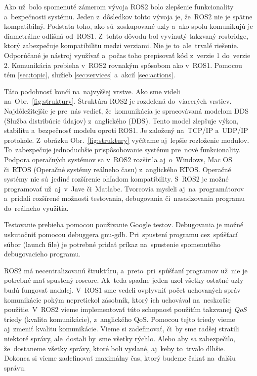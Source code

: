 Ako už~bolo spomenuté zámerom vývoja ROS2 bolo zlepšenie funkcionality a~bezpečnosti systému. Jeden z~dôsledkov tohto vývoja je, že~ROS2
nie je spätne kompatibilný. Podstata toho, ako sú~zoskupované uzly a~ako spolu komunikujú je diametrálne odlišná od~ROS1. Z~tohto dôvodu
bol vyvinutý takzvaný rosbridge, ktorý zabezpečuje kompatibilitu medzi verziami. Nie je to~ale~trvalé riešenie. Odporúčané je nástroj
využívať a~počas toho prepisovať kód z~verzie 1 do~verzie 2. Komunikácia prebieha v~ROS2 rovnakým spôsobom ako v~ROS1. Pomocou tém
\ref{sec:topic}, služieb \ref{sec:services} a~akcií \ref{sec:actions}.

Táto podobnosť končí na~najvyššej vrstve. Ako sme videli na~Obr.~\ref{fig:struktury}. Štruktúra ROS2 je rozdelená do~viacerých vrstiev.
Najdôležitejšie je pre~nás vedieť, že~komunikácia je spracovávaná modelom DDS (Služba distribúcie údajov) z~anglického (\acrlong{DDS}). Tento
model zlepšuje výkon, stabilitu a~bezpečnosť modelu oproti ROS1. Je založený na~TCP/IP a~UDP/IP protokole. Z~obrázku Obr.~\ref{fig:struktury}
vyčítame aj~lepšie rozloženie modulov. To~zabezpečuje jednoduchšie prispôsobovanie systému pre~nové funkcionality. Podpora operačných systémov
sa v~ROS2 rozšírila aj~o~Windows, Mac OS či~RTOS (Operačné systémy reálneho času) z~anglického \acrlong{RTOS}. Operačné systémy nie sú~jediné
rozšírenie ohľadom kompatibility. S~ROS2 je možné programovať už~aj~v~Jave či~Matlabe. Tvorcovia mysleli aj~na~programátorov a~pridali rozšírené
možnosti testovania, debugovania či~nasadzovania programu do~reálneho využitia.

Testovanie prebieha pomocou použivanie Google testov. Debugovania je možné uskutočniť pomocou debuggera gnu-gdb. Pri~spustení programu
cez~spúšťací súbor (launch file) je potrebné pridať príkaz na~spustenie spomenutého debugovacieho programu.

ROS2 má necentralizovanú štruktúru, a~preto~pri~spúšťaní programov už~nie je potrebné mať spustený roscore. Ak~teda spadne jeden uzol všetky
ostatné uzly budú fungovať naďalej. V~ROS1 sme vedeli ovplyvniť počet uchovaných správ komunikácie pokým nepretiekol zásobník, ktorý ich uchovával
na~neskoršie použitie. V~ROS2 vieme implementovať túto schopnosť použitím takzvanej \textit{QoS} triedy (kvalita komunikácie), z~anglického \acrlong{QoS}.
Pomocou tejto triedy vieme aj~zmeniť kvalitu komunikácie. Vieme si zadefinovať, či~by sme radšej stratili niektoré správy, ale~dostali by~sme
všetky rýchlo. Alebo aby sa zabezpečilo, že~dostaneme všetky správy, ktoré boli vyslané, aj~keby to~trvalo dlhšie. Dokonca si vieme zadefinovať
maximálny čas, ktorý budeme čakať na~ďalšiu správu.

